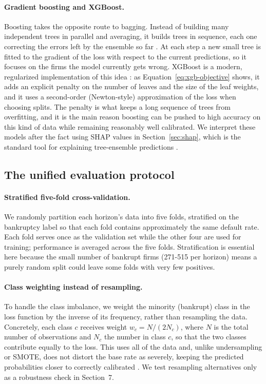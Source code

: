 \documentclass[12pt,a4paper]{article}
\begin{document}
\paragraph{Gradient boosting and XGBoost.} Boosting takes the opposite route to
bagging. Instead of building many independent trees in parallel and averaging,
it builds trees in sequence, each one correcting the errors left by the
ensemble so far \citep{friedman2001}. At each step a new small tree is fitted
to the gradient of the loss with respect to the current predictions, so it
focuses on the firms the model currently gets wrong. XGBoost is a modern,
regularized implementation of this idea \citep{chen2016}: as
Equation~\eqref{eq:xgb-objective} shows, it adds an explicit penalty on the
number of leaves and the size of the leaf weights, and it uses a second-order
(Newton-style) approximation of the loss when choosing splits. The penalty is
what keeps a long sequence of trees from overfitting, and it is the main reason
boosting can be pushed to high accuracy on this kind of data while remaining
reasonably well calibrated. We interpret these models after the fact using SHAP
values in Section~\ref{sec:shap}, which is the standard tool for explaining
tree-ensemble predictions \citep{lundberg2017}.

\subsection{The unified evaluation protocol}

\paragraph{Stratified five-fold cross-validation.} We randomly partition each
horizon's data into five folds, stratified on the bankruptcy label so that
each fold contains approximately the same default rate. Each fold serves once
as the validation set while the other four are used for training; performance
is averaged across the five folds. Stratification is essential here because
the small number of bankrupt firms (271-515 per horizon) means a purely
random split could leave some folds with very few positives.

\paragraph{Class weighting instead of resampling.} To handle the class
imbalance, we weight the minority (bankrupt) class in the loss function by
the inverse of its frequency, rather than resampling the data. Concretely,
each class $c$ receives weight $w_c = N / (2 N_c)$, where $N$ is the total
number of observations and $N_c$ the number in class $c$, so that the two
classes contribute equally to the loss. This uses all of the data and, unlike
undersampling or SMOTE, does not distort the base rate as severely, keeping
the predicted probabilities closer to correctly calibrated
\citep{king2001}. We test resampling alternatives only as a robustness check
in Section~7.
\end{document}

